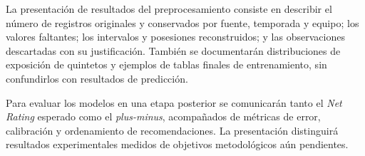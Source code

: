 La presentación de resultados del preprocesamiento consiste en describir el número de registros originales y conservados por fuente, temporada y equipo; los valores faltantes; los intervalos y posesiones reconstruidos; y las observaciones descartadas con su justificación. También se documentarán distribuciones de exposición de quintetos y ejemplos de tablas finales de entrenamiento, sin confundirlos con resultados de predicción.

Para evaluar los modelos en una etapa posterior se comunicarán tanto el \textit{Net Rating} esperado como el \textit{plus-minus}, acompañados de métricas de error, calibración y ordenamiento de recomendaciones. La presentación distinguirá resultados experimentales medidos de objetivos metodológicos aún pendientes.